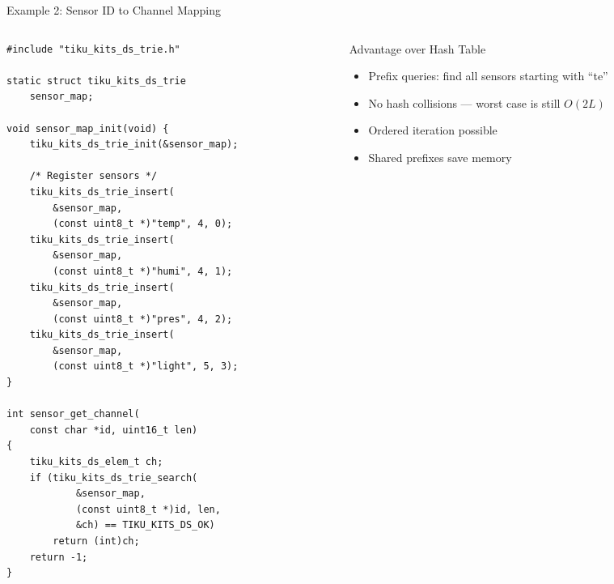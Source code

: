 \documentclass[aspectratio=169, 10pt]{beamer}
\begin{document}
\begin{frame}[fragile]{Example 2: Sensor ID to Channel Mapping}
\begin{columns}[T]
\begin{column}{0.48\textwidth}
\begin{lstlisting}[style=cstyle,
  title={Map sensor string IDs to ADC channels}]
#include "tiku_kits_ds_trie.h"

static struct tiku_kits_ds_trie
    sensor_map;

void sensor_map_init(void) {
    tiku_kits_ds_trie_init(&sensor_map);

    /* Register sensors */
    tiku_kits_ds_trie_insert(
        &sensor_map,
        (const uint8_t *)"temp", 4, 0);
    tiku_kits_ds_trie_insert(
        &sensor_map,
        (const uint8_t *)"humi", 4, 1);
    tiku_kits_ds_trie_insert(
        &sensor_map,
        (const uint8_t *)"pres", 4, 2);
    tiku_kits_ds_trie_insert(
        &sensor_map,
        (const uint8_t *)"light", 5, 3);
}

int sensor_get_channel(
    const char *id, uint16_t len)
{
    tiku_kits_ds_elem_t ch;
    if (tiku_kits_ds_trie_search(
            &sensor_map,
            (const uint8_t *)id, len,
            &ch) == TIKU_KITS_DS_OK)
        return (int)ch;
    return -1;
}
\end{lstlisting}
\end{column}

\begin{column}{0.48\textwidth}
\begin{center}
\end{center}

\vspace{0.5em}
\begin{block}{Advantage over Hash Table}
\begin{itemize}
  \item Prefix queries: find all sensors starting with ``te''
  \item No hash collisions --- worst case is still $O(2L)$
  \item Ordered iteration possible
  \item Shared prefixes save memory
\end{itemize}
\end{block}


\end{column}
\end{columns}
\end{frame}
\end{document}
